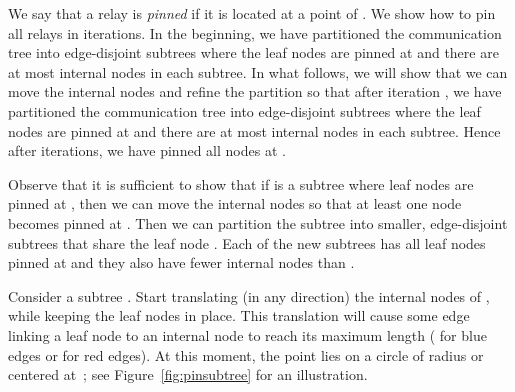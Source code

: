 \documentclass[11pt,a4paper]{article}
\theoremstyle{definition}
\theoremstyle{remark}
\begin{document}
\begin{enumerate}
We say that a relay is \emph{pinned} if it is located at a point of . We show how to pin all relays in  iterations. In the beginning, we have partitioned the communication tree into edge-disjoint subtrees where the leaf nodes are pinned at  and there are at most  internal nodes in each subtree. In what follows, we will show that we can move the internal nodes and refine the partition so that after iteration , we have partitioned the communication tree into edge-disjoint subtrees where the leaf nodes are pinned at  and there are at most  internal nodes in each subtree. Hence after  iterations, we have pinned all nodes at .

Observe that it is sufficient to show that if  is a subtree where leaf nodes are pinned at , then we can move the internal nodes so that at least one node  becomes pinned at . Then we can partition the subtree  into smaller, edge-disjoint subtrees that share the leaf node . Each of the new subtrees has all leaf nodes pinned at  and they also have fewer internal nodes than .

Consider a subtree . Start translating (in any direction) the internal nodes of , while keeping the leaf nodes in place. This translation will cause some edge  linking a leaf node  to an internal node  to reach its maximum length ( for blue edges or  for red edges). At this moment, the point  lies on a circle  of radius  or  centered at~; see Figure~\ref{fig:pinsubtree} for an illustration.


\end{enumerate}
\end{document}

